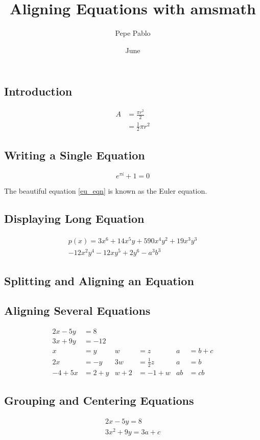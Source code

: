 \documentclass{article}
\title{Aligning Equations with amsmath}
\author{Pepe Pablo}
\date{June}
\begin{document}
\maketitle

\subsection*{Introduction}
\begin{equation} \label{eq1}
	\begin{split}
		A & = \frac{\pi r^2}{2} \\
		& = \frac{1}{2} \pi r^2
	\end{split}
\end{equation}

\subsection*{Writing a Single Equation}

\begin{equation} \label{eu_eqn}
	e^{\pi i} + 1 = 0
\end{equation}

The beautiful equation \ref{eu_eqn} is known as the Euler equation.

\subsection*{Displaying Long Equation}
\begin{multline*}
	p(x) = 3x^6 + 14x^5y + 590x^4y^2 + 19x^3y^3\\ 
	- 12x^2y^4 - 12xy^5 + 2y^6 - a^3b^3
\end{multline*}

\subsection*{Splitting and Aligning an Equation}
\subsection{Aligning Several Equations}
\begin{align*} 
	2x - 5y &=  8 \\ 
	3x + 9y &=  -12\\
	x&=y           &  w &=z              &  a&=b+c\\
	2x&=-y         &  3w&=\frac{1}{2}z   &  a&=b\\
	-4 + 5x&=2+y   &  w+2&=-1+w          &  ab&=cb
\end{align*}

\subsection*{Grouping and Centering Equations}
\begin{gather*} 
	2x - 5y =  8 \\ 
	3x^2 + 9y =  3a + c
\end{gather*}
\end{document}
